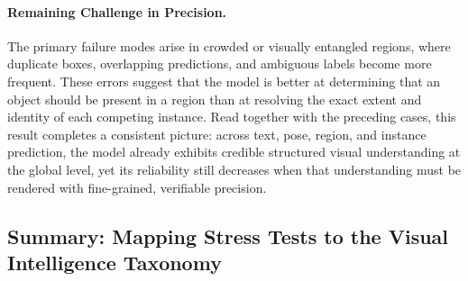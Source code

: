 \paragraph{Remaining Challenge in Precision.}
The primary failure modes arise in crowded or visually entangled regions, where duplicate boxes, overlapping predictions, and ambiguous labels become more frequent. These errors suggest that the model is better at determining that an object should be present in a region than at resolving the exact extent and identity of each competing instance. Read together with the preceding cases, this result completes a consistent picture: across text, pose, region, and instance prediction, the model already exhibits credible structured visual understanding at the global level, yet its reliability still decreases when that understanding must be rendered with fine-grained, verifiable precision.

\subsection{Summary: Mapping Stress Tests to the Visual Intelligence Taxonomy}

